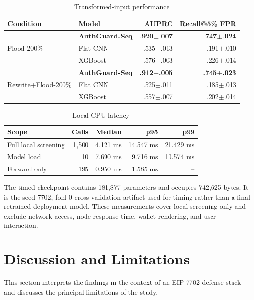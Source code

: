 \documentclass[conference]{IEEEtran}
\begin{document}
\begin{table}[t]
\centering
\caption{Transformed-input performance}
\label{tab:robust}
\scriptsize
\begin{tabularx}{\columnwidth}{@{}l X r r@{}}
\toprule
Condition & Model & AUPRC & Recall@5\% FPR \\
\midrule
\multirow{3}{*}{Flood-200\%}
& \textbf{AuthGuard-Seq} & \textbf{.920$\pm$.007} & \textbf{.747$\pm$.024} \\
& Flat CNN & .535$\pm$.013 & .191$\pm$.010 \\
& XGBoost & .576$\pm$.003 & .226$\pm$.014 \\
\midrule
\multirow{3}{*}{Rewrite+Flood-200\%}
& \textbf{AuthGuard-Seq} & \textbf{.912$\pm$.005} & \textbf{.745$\pm$.023} \\
& Flat CNN & .525$\pm$.011 & .185$\pm$.013 \\
& XGBoost & .557$\pm$.007 & .202$\pm$.014 \\
\bottomrule
\end{tabularx}
\end{table}



\begin{table}[t]
\centering
\caption{Local CPU latency}
\label{tab:latency}
\scriptsize
\begin{tabularx}{\columnwidth}{@{}X r r r r@{}}
\toprule
Scope & Calls & Median & p95 & p99 \\
\midrule
Full local screening & 1,500 & 4.121 ms & 14.547 ms & 21.429 ms \\
Model load & 10 & 7.690 ms & 9.716 ms & 10.574 ms \\
Forward only & 195 & 0.950 ms & 1.585 ms & -- \\
\bottomrule
\end{tabularx}
\end{table}

The timed checkpoint contains 181,877 parameters and occupies 742,625 bytes. It is the seed-7702, fold-0 cross-validation artifact used for timing rather than a final retrained deployment model. These measurements cover local screening only and exclude network access, node response time, wallet rendering, and user interaction.

\section{Discussion and Limitations}
\label{sec:discussion}
This section interprets the findings in the context of an EIP-7702 defense stack and discusses the principal limitations of the study.
\end{document}

